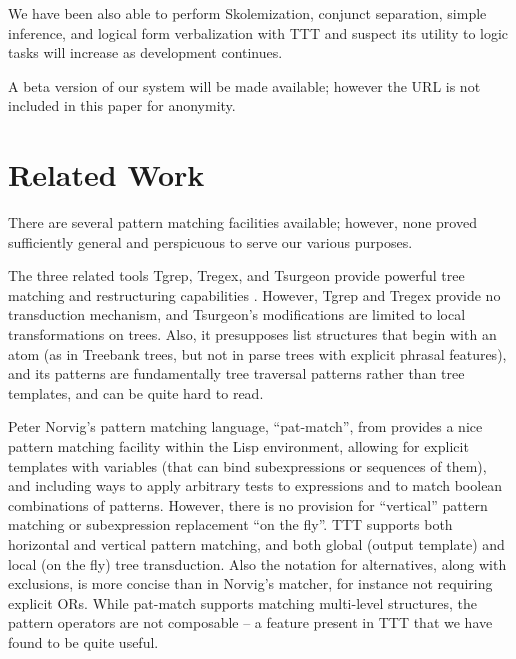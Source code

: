 \documentclass[a4,11pt]{article}
\begin{document}
We have been also able to perform Skolemization, conjunct separation, simple inference, and logical form verbalization with TTT and suspect its utility to logic tasks will increase as development continues.

A beta version of our system will be made available; however the URL is not included in this paper for anonymity. 


\section{Related Work}
There are several pattern matching facilities available; however, none proved sufficiently general and perspicuous to serve our various purposes.

The three related tools Tgrep, Tregex, and Tsurgeon provide powerful tree matching and restructuring capabilities \cite{Levy-Andrew:2006}. However, Tgrep and Tregex provide no transduction mechanism, and Tsurgeon's modifications are limited to local transformations on trees. Also, it presupposes list structures that begin with an atom (as in Treebank trees, but not in parse trees with explicit phrasal features), and its patterns are fundamentally tree traversal patterns rather than tree templates, and can be quite hard to read. 

Peter Norvig's pattern matching language, ``pat-match'', from \cite{Norvig:1991} provides a nice pattern matching facility within the Lisp environment, allowing for explicit templates with variables (that can bind subexpressions or sequences of them), and including ways to apply arbitrary tests to expressions and to match boolean combinations of patterns. However, there is no provision for ``vertical'' pattern matching or subexpression replacement ``on the fly''. TTT supports both horizontal and vertical pattern matching, and both global (output template) and local (on the fly) tree transduction. Also the notation for alternatives, along with exclusions, is more concise than in Norvig's matcher, for instance not requiring explicit ORs. While pat-match supports matching multi-level structures, the pattern operators are not composable -- a feature present in TTT that we have found to be quite useful.  
\end{document}
